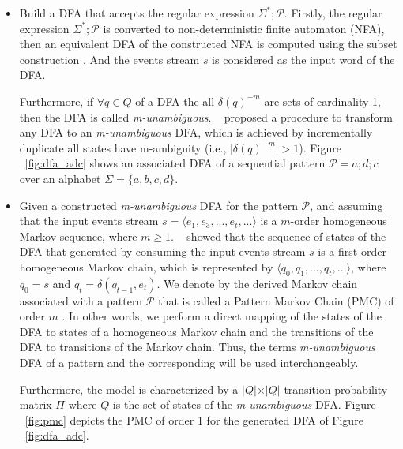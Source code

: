 \begin{itemize}[noitemsep]
	\item Build a DFA that accepts the regular expression $\Sigma^{*};\mathcal{P}$. Firstly, the regular expression $\Sigma^{*};\mathcal{P}$ is converted to non-deterministic finite automaton (NFA), then an equivalent DFA of the constructed NFA is computed using the subset construction \cite{hopcroft2006automata,alevizos2017event}. And the events stream $s$ is considered as the input word of the DFA. 

\par Furthermore, if $\forall q \in Q$ of a DFA the all $\delta(q)^{-m}$ are sets of cardinality 1, then the DFA is called \textit{m-unambiguous}. ~\citet{nuel_pattern_2008} proposed a procedure to transform any DFA to an \textit{m-unambiguous} DFA, which is achieved by incrementally duplicate all states have m-ambiguity (i.e., $\vert\delta(q)^{-m}\vert > 1$).   Figure ~\ref{fig:dfa_adc} shows an associated DFA of a sequential pattern $\mathcal{P}=a ; d ; c$ over an alphabet $\Sigma=\{a,b,c,d\}$. 





\item  Given a constructed \textit{m-unambiguous} DFA for the pattern $\mathcal{P}$, and  assuming that the input events stream $s=\langle e_1,e_3,...,e_t,...\rangle$ is a $m$-order homogeneous Markov sequence, where $m \geq 1$.  ~\citet{nuel_pattern_2008} showed that the sequence of states of the DFA that generated by consuming the input events stream $s$ is a first-order homogeneous Markov chain, which is represented by $\langle q_{0},q_{1},...,q_{t},...\rangle$, where $q_{0}=s$ and $q_{t}=\delta(q_{t-1},e_{t})$. We denote by \pmcmr the derived Markov chain associated with a pattern $\mathcal{P}$ that is called a Pattern Markov Chain (PMC) of order $m$ \cite{nuel_pattern_2008}. In other words, we perform a direct mapping of the states of the DFA to states of a homogeneous Markov chain and the transitions of the DFA to transitions of the Markov chain. Thus, the terms \textit{m-unambiguous} DFA of a pattern and the corresponding \pmcmr  will be used interchangeably. 

\par Furthermore, the \pmcmr model is characterized by a $\vert Q \vert \times \vert Q \vert$ transition probability matrix $\Pi$ where $Q$ is the set of states of the  \textit{m-unambiguous} DFA. Figure ~\ref{fig:pmc} depicts the PMC of order 1 for the generated DFA of Figure ~\ref{fig:dfa_adc}.


\end{itemize}
